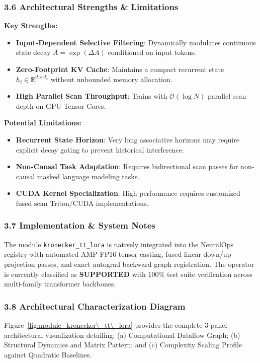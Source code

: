 \subsubsection*{3.6 Architectural Strengths \& Limitations}
\textbf{Key Strengths:}
\begin{itemize}
    \item \textbf{Input-Dependent Selective Filtering}: Dynamically modulates continuous state decay $\bar{A} = \exp(\Delta A)$ conditioned on input tokens.
    \item \textbf{Zero-Footprint KV Cache}: Maintains a compact recurrent state $h_t \in \mathbb{R}^{d \times d_s}$ without unbounded memory allocation.
    \item \textbf{High Parallel Scan Throughput}: Trains with $\mathcal{O}(\log N)$ parallel scan depth on GPU Tensor Cores.
\end{itemize}

\textbf{Potential Limitations:}
\begin{itemize}
    \item \textbf{Recurrent State Horizon}: Very long associative horizons may require explicit decay gating to prevent historical interference.
    \item \textbf{Non-Causal Task Adaptation}: Requires bidirectional scan passes for non-causal masked language modeling tasks.
    \item \textbf{CUDA Kernel Specialization}: High performance requires customized fused scan Triton/CUDA implementations.
\end{itemize}

\subsubsection*{3.7 Implementation \& System Notes}
The module \texttt{kronecker\_tt\_lora} is natively integrated into the NeuralOps registry with automated AMP FP16 tensor casting, fused linear down/up-projection passes, and exact autograd backward graph registration. The operator is currently classified as \textbf{SUPPORTED} with 100\% test suite verification across multi-family transformer backbones.

\subsubsection*{3.8 Architectural Characterization Diagram}
Figure~\ref{fig:module_kronecker\_tt\_lora} provides the complete 3-panel architectural visualization detailing: (a) Computational Dataflow Graph; (b) Structural Dynamics and Matrix Pattern; and (c) Complexity Scaling Profile against Quadratic Baselines.

